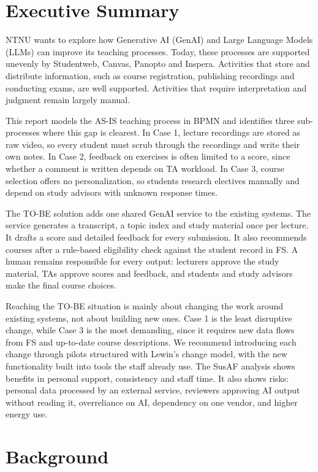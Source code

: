 \section{Executive Summary}\label{sec:summary}

NTNU wants to explore how Generative AI (GenAI) and Large Language Models (LLMs) can improve its teaching processes. Today, these processes are supported unevenly by Studentweb, Canvas, Panopto and Inspera. Activities that store and distribute information, such as course registration, publishing recordings and conducting exams, are well supported. Activities that require interpretation and judgment remain largely manual.

This report models the AS-IS teaching process in BPMN and identifies three sub-processes where this gap is clearest. In Case 1, lecture recordings are stored as raw video, so every student must scrub through the recordings and write their own notes. In Case 2, feedback on exercises is often limited to a score, since whether a comment is written depends on TA workload. In Case 3, course selection offers no personalization, so students research electives manually and depend on study advisors with unknown response times.

The TO-BE solution adds one shared GenAI service to the existing systems. The service generates a transcript, a topic index and study material once per lecture. It drafts a score and detailed feedback for every submission. It also recommends courses after a rule-based eligibility check against the student record in FS. A human remains responsible for every output: lecturers approve the study material, TAs approve scores and feedback, and students and study advisors make the final course choices.

Reaching the TO-BE situation is mainly about changing the work around existing systems, not about building new ones. Case 1 is the least disruptive change, while Case 3 is the most demanding, since it requires new data flows from FS and up-to-date course descriptions. We recommend introducing each change through pilots structured with Lewin's change model, with the new functionality built into tools the staff already use. The SusAF analysis shows benefits in personal support, consistency and staff time. It also shows risks: personal data processed by an external service, reviewers approving AI output without reading it, overreliance on AI, dependency on one vendor, and higher energy use.

\section{Background}\label{sec:background}

